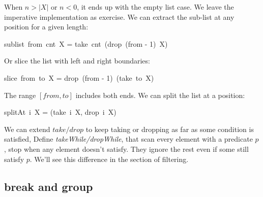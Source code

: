 \documentclass[b5paper]{article}
\begin{document}
When $n > |X|$ or $n < 0$, it ends up with the empty list case. We leave the imperative implementation as exercise. We can extract the sub-list at any position for a given length:

\be
sublist\ from\ cnt\ X = take\ cnt\ (drop\ (from - 1)\ X)
\ee

Or slice the list with left and right boundaries:

\be
slice\ from\ to\ X = drop\ (from - 1)\ (take\ to\ X)
\ee

The range $[from, to]$ includes both ends. We can split the list at a position:

\be
splitAt\ i\ X = (take\ i\ X, drop\ i\ X)
\label{eq:split-at}
\ee

 
We can extend $take/drop$ to keep taking or dropping as far as some condition is satisfied, Define \textit{takeWhile/dropWhile}, that scan every element with a predicate $p$, stop when any element doesn't satisfy. They ignore the rest even if some still satisfy $p$. We'll see this difference in the section of filtering.

\be
{}
\ee

\subsection{break and group}
 
\end{document}
